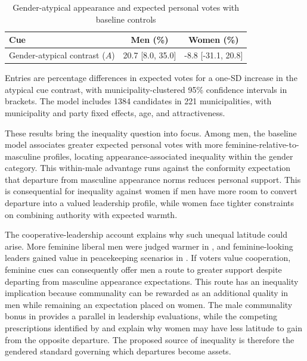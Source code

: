 \documentclass[11pt,a4paper]{article}\usepackage[]{graphicx}\usepackage[]{xcolor}
\begin{document}
\begin{table}[!htbp]
\centering
\small
\caption{Gender-atypical appearance and expected personal votes with baseline controls}
\label{tab:main}
\begin{tabular}{lcc}
\toprule
Cue & Men (\%) & Women (\%) \\
\midrule
Gender-atypical contrast ($A$) & 20.7 [8.0, 35.0] & -8.8 [-31.1, 20.8] \\
\bottomrule
\end{tabular}
\begin{minipage}{\linewidth}\footnotesize
Entries are percentage differences in expected votes for a one-SD increase in the atypical cue contrast, with municipality-clustered 95\% confidence intervals in brackets. The model includes 1384 candidates in 221 municipalities, with municipality and party fixed effects, age, and attractiveness.
\end{minipage}
\end{table}

These results bring the inequality question into focus. Among men, the baseline model associates greater expected personal votes with more feminine-relative-to-masculine profiles, locating appearance-associated inequality within the gender category. This within-male advantage runs against the conformity expectation that departure from masculine appearance norms reduces personal support. This is consequential for inequality against women if men have more room to convert departure into a valued leadership profile, while women face tighter constraints on combining authority with expected warmth.

The cooperative-leadership account explains why such unequal latitude could arise. More feminine liberal men were judged warmer in \textcite{CarpinellaJohnson2013b}, and feminine-looking leaders gained value in peacekeeping scenarios in \textcite{SpisakWarriors2012}. If voters value cooperation, feminine cues can consequently offer men a route to greater support despite departing from masculine appearance expectations. This route has an inequality implication because communality can be rewarded as an additional quality in men while remaining an expectation placed on women. The male communality bonus in \textcite{Hentschel2018} provides a parallel in leadership evaluations, while the competing prescriptions identified by \textcite{Eagly2002} and \textcite{RudmanGlick2001} explain why women may have less latitude to gain from the opposite departure. The proposed source of inequality is therefore the gendered standard governing which departures become assets.
\end{document}
